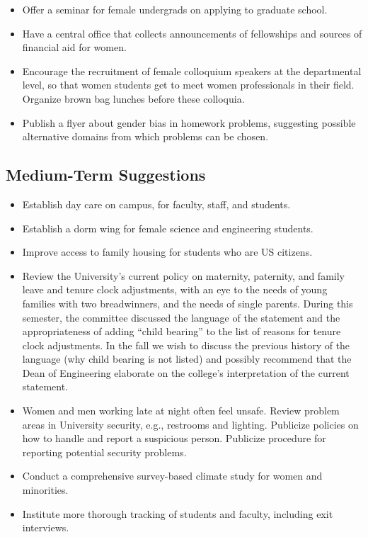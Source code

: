 \begin{itemize}
\item
Offer a seminar for female undergrads on applying to graduate school.

\item
Have a central office that collects announcements of fellowships
and sources of financial aid for women.

\item
Encourage the recruitment of female colloquium speakers at the
departmental level, so that women students get to meet women
professionals in their field.  Organize brown bag lunches before 
these colloquia.

\item
Publish a flyer about gender bias in homework problems, suggesting
possible alternative domains from which problems can be chosen.

\end{itemize}
\subsection{Medium-Term Suggestions}
\begin{itemize}

\item
Establish day care on campus, for
faculty, staff, and students.

\item 
Establish a dorm wing for female science and engineering students.

\item 
Improve access to family housing for students who are US citizens.

\item
Review the University's current policy on maternity,
paternity, and family leave and tenure clock adjustments,
with an eye to the needs of young families with two breadwinners,
and the needs of single parents.
During this semester, the committee discussed
the language of the statement and the appropriateness of adding ``child
bearing'' to the list of reasons for tenure
clock adjustments.  In the fall we wish to discuss the
previous history of the language (why child bearing is not listed) and
possibly recommend that the Dean of Engineering elaborate on the college's
interpretation of the current statement.

\item
Women and men working late at night often feel unsafe.
Review problem areas in University security, e.g., restrooms
and lighting.  Publicize policies on how to handle
and report a suspicious person.  Publicize procedure for reporting
potential security problems.

\item
Conduct a comprehensive survey-based climate study for women and
minorities.

\item
Institute more thorough tracking of students and
faculty, including exit interviews.

\end{itemize}

